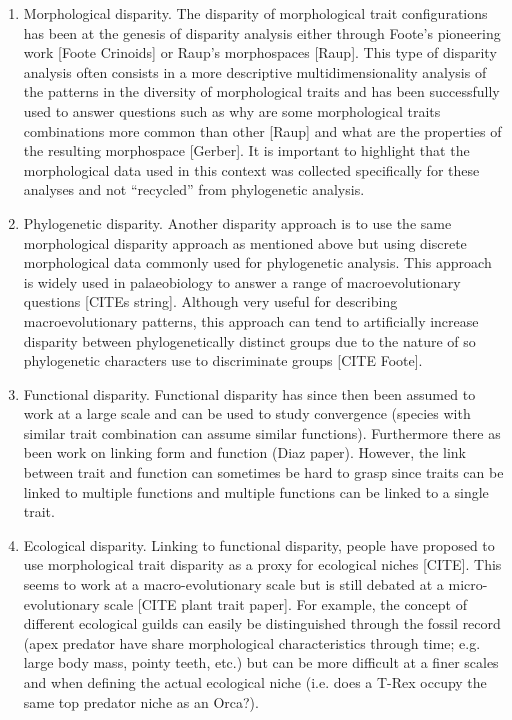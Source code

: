 \documentclass[12pt,letterpaper]{article}
\begin{document}
\begin{enumerate}

\item{Morphological disparity.}
The disparity of morphological trait configurations has been at the genesis of disparity analysis either through Foote's pioneering work [Foote Crinoids] or Raup's morphospaces [Raup].
This type of disparity analysis often consists in a more descriptive multidimensionality analysis of the patterns in the diversity of morphological traits and has been successfully used to answer questions such as why are some morphological traits combinations more common than other [Raup] and what are the properties of the resulting morphospace [Gerber].
It is important to highlight that the morphological data used in this context was collected specifically for these analyses and not ``recycled'' from phylogenetic analysis.

\item{Phylogenetic disparity.}
Another disparity approach is to use the same morphological disparity approach as mentioned above but using discrete morphological data commonly used for phylogenetic analysis.
This approach is widely used in palaeobiology to answer a range of macroevolutionary questions [CITEs string].
Although very useful for describing macroevolutionary patterns, this approach can tend to artificially increase disparity between phylogenetically distinct groups due to the nature of so phylogenetic characters use to discriminate groups [CITE Foote].

\item{Functional disparity.}
Functional disparity has since then been assumed to work at a large scale and can be used to study convergence (species with similar trait combination can assume similar functions).
Furthermore there as been work on linking form and function (Diaz paper).
However, the link between trait and function can sometimes be hard to grasp since traits can be linked to multiple functions and multiple functions can be linked to a single trait.

\item{Ecological disparity.}
Linking to functional disparity, people have proposed to use morphological trait disparity as a proxy for ecological niches [CITE].
This seems to work at a macro-evolutionary scale but is still debated at a micro-evolutionary scale [CITE plant trait paper].
For example, the concept of different ecological guilds can easily be distinguished through the fossil record (apex predator have share morphological characteristics through time; e.g. large body mass, pointy teeth, etc.) but can be more difficult at a finer scales and when defining the actual ecological niche (i.e. does a T-Rex occupy the same top predator niche as an Orca?).

\end{enumerate}
\end{document}
